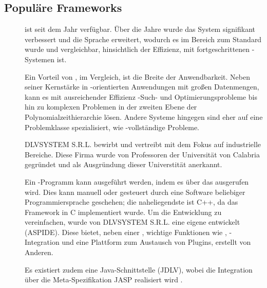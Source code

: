 \subsection{Populäre Frameworks}\label{subsec:populare-frameworks}

\begin{description}
    \item[] ist seit dem Jahr  verfügbar.
    Über die Jahre wurde das System signifikant verbessert und die Sprache erweitert, wodurch es im Bereich  zum Standard wurde und vergleichbar, \insb hinsichtlich der Effizienz, mit fortgeschrittenen -Systemen ist.

    Ein Vorteil von , im Vergleich, ist die Breite der Anwendbarkeit.
    Neben seiner Kernstärke in -orientierten Anwendungen mit großen Datenmengen, kann es mit ausreichender Effizienz -Such- und Optimierungsprobleme bis hin zu komplexen Problemen in der zweiten Ebene der Polynomialzeithierarchie lösen.
    Andere Systeme hingegen sind eher auf eine Problemklasse spezialisiert, wie \zB {}-vollständige Probleme.

    DLVSYSTEM S.R.L. bewirbt und vertreibt  mit dem Fokus auf industrielle Bereiche.
    Diese Firma wurde  von Professoren der Universität von Calabria gegründet und  als Ausgründung dieser Universtität anerkannt.

    Ein -Programm kann ausgeführt werden, indem es über das  ausgerufen wird.
    Dies kann manuell oder gesteuert durch eine Software beliebiger Programmiersprache geschehen;
    die naheliegendste ist C++, da das Framework in C implementiert wurde.
    Um die Entwicklung zu vereinfachen, wurde von DLVSYSTEM S.R.L. eine eigene  entwickelt (ASPIDE).
    Diese bietet, neben einer , wichtige Funktionen wie , -Integration und eine Plattform zum Austausch von Plugins, erstellt von Anderen.

    Es existiert zudem eine Java-Schnittstelle (JDLV), wobei die Integration über die Meta-Spezifikation JASP realisiert wird .


\end{description}
